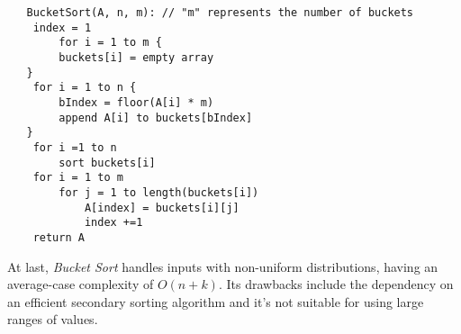 \documentclass[11pt, letter paper]{article}
\begin{document}
        \begin{lstlisting}
   BucketSort(A, n, m): // "m" represents the number of buckets
	index = 1
        for i = 1 to m {
		buckets[i] = empty array
   }
	for i = 1 to n {
		bIndex = floor(A[i] * m) 
		append A[i] to buckets[bIndex]
   }
	for i =1 to n
		sort buckets[i]
	for i = 1 to m
		for j = 1 to length(buckets[i])
			A[index] = buckets[i][j]
			index +=1
	return A

        \end{lstlisting}

        At last, \emph{Bucket Sort} handles inputs with non-uniform distributions, having an average-case complexity of $O(n + k)$. Its drawbacks include the dependency on an efficient secondary sorting algorithm and it's not suitable for using large ranges of values.
\end{document}
